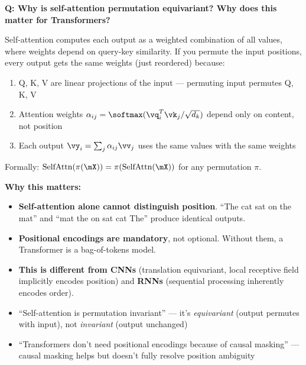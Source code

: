 \begin{interviewq}
\textbf{Q: Why is self-attention permutation equivariant? Why does this matter for Transformers?}

 \quad {} \quad \badgefreq{\freqmed}

\stronganswer Self-attention computes each output as a weighted combination of all values, where weights depend on query-key similarity. If you permute the input positions, every output gets the same weights (just reordered) because:

\begin{enumerate}
    \item Q, K, V are linear projections of the input --- permuting input permutes Q, K, V
    \item Attention weights $\alpha_{ij} = \softmax(\vq_i^T \vk_j / \sqrt{d_k})$ depend only on content, not position
    \item Each output $\vy_i = \sum_j \alpha_{ij} \vv_j$ uses the same values with the same weights
\end{enumerate}

Formally: $\text{SelfAttn}(\pi(\mX)) = \pi(\text{SelfAttn}(\mX))$ for any permutation $\pi$.

\textbf{Why this matters:}
\begin{itemize}
    \item \textbf{Self-attention alone cannot distinguish position}. ``The cat sat on the mat'' and ``mat the on sat cat The'' produce identical outputs.
    \item \textbf{Positional encodings are mandatory}, not optional. Without them, a Transformer is a bag-of-tokens model.
    \item \textbf{This is different from CNNs} (translation equivariant, local receptive field implicitly encodes position) and \textbf{RNNs} (sequential processing inherently encodes order).
\end{itemize}

\redflags
\begin{itemize}
    \item ``Self-attention is permutation invariant'' --- it's \textit{equivariant} (output permutes with input), not \textit{invariant} (output unchanged)
    \item ``Transformers don't need positional encodings because of causal masking'' --- causal masking helps but doesn't fully resolve position ambiguity
\end{itemize}


\end{interviewq}
